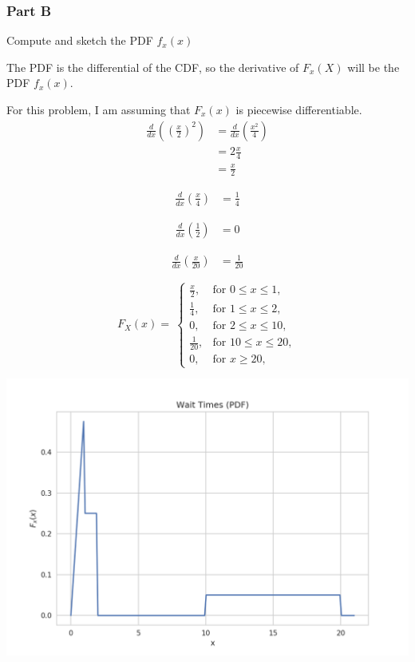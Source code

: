 \documentclass[12pt]{article}
\begin{document}
\subsubsection{Part B}
Compute and sketch the PDF $f_x(x)$

The PDF is the differential of the CDF, so the derivative of $F_x(X)$ will be the PDF $f_x(x)$.

For this problem, I am assuming that $F_x(x)$ is piecewise differentiable.\\
\begin{align*}
\frac{d}{dx}((\frac{x}{2})^2) &= \frac{d}{dx}(\frac{x^2}{4})\\
&= 2\frac{x}{4}\\
&= \frac{x}{2}
\end{align*}

\begin{align*}
\frac{d}{dx}(\frac{x}{4}) &= \frac{1}{4}
\end{align*}

\begin{align*}
\frac{d}{dx}(\frac{1}{2}) &= 0
\end{align*}

\begin{align*}
\frac{d}{dx}(\frac{x}{20}) &= \frac{1}{20}
\end{align*}

\begin{equation*}
  F_X(x)=\
    \begin{cases}
      \frac{x}{2}, & \text{for }0\leq x \leq1,\\
      \frac{1}{4},  & \text{for }1\leq x \leq2,\\
      0,            & \text{for }2\leq x \leq10,\\
      \frac{1}{20}, & \text{for }10\leq x \leq20,\\
      0,            & \text{for }x\geq 20,
    \end{cases}
\end{equation*}

\includegraphics[scale=0.7]{plot-wait-times-pdf}
\end{document}
